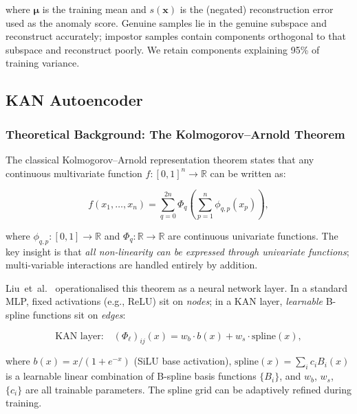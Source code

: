 \documentclass[12pt, a4paper]{article}
\newcommand{\R}{\mathbb{R}}
\begin{document}
\noindent where $\boldsymbol{\mu}$ is the training mean and
$s(\mathbf{x})$ is the (negated) reconstruction error used as the
anomaly score.
Genuine samples lie in the genuine subspace and reconstruct accurately;
impostor samples contain components orthogonal to that subspace and
reconstruct poorly. We retain components explaining 95\% of training
variance.

\subsection{KAN Autoencoder}
\label{sec:kan_theory}

\subsubsection{Theoretical Background: The Kolmogorov--Arnold Theorem}

The classical Kolmogorov--Arnold representation theorem
states that any continuous multivariate function
$f: [0,1]^n \to \R$ can be written as:

\begin{mathbox}
\begin{equation}
  f(x_1, \dots, x_n)
  = \sum_{q=0}^{2n}
    \Phi_q\!\left(
      \sum_{p=1}^{n} \phi_{q,p}(x_p)
    \right),
  \label{eq:ka_theorem}
\end{equation}
\end{mathbox}

\noindent where $\phi_{q,p}: [0,1] \to \R$ and $\Phi_q: \R \to \R$
are continuous univariate functions.
The key insight is that \textit{all non-linearity can be expressed through
univariate functions}; multi-variable interactions are handled entirely
by addition.

Liu~et~al.~\cite{liu2024} operationalised this theorem as a neural
network layer. In a standard MLP, fixed activations (e.g., ReLU) sit
on \textit{nodes}; in a KAN layer, \textit{learnable} B-spline functions
sit on \textit{edges}:

\begin{mathbox}
\begin{equation}
  \text{KAN layer:} \quad
  (\Phi_\ell)_{ij}(x) = w_b \cdot b(x) + w_s \cdot \text{spline}(x),
  \label{eq:kan_layer}
\end{equation}
\end{mathbox}

\noindent where $b(x) = x / (1 + e^{-x})$ (SiLU base activation),
$\text{spline}(x) = \sum_i c_i B_i(x)$ is a learnable linear combination
of B-spline basis functions $\{B_i\}$, and $w_b$, $w_s$, $\{c_i\}$ are
all trainable parameters. The spline grid can be adaptively refined
during training.
\end{document}
